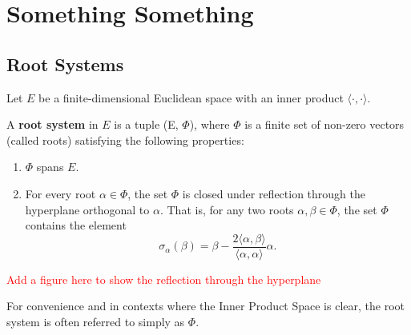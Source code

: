 %


\chapter{Something Something}
\section{Root Systems}

\begin{definition}
    Let $E$ be a finite-dimensional Euclidean space with an inner product $\langle \cdot, \cdot \rangle$.
    
    A \textbf{root system} in $E$ is a tuple (E, $\Phi$), where $\Phi$ is a finite set of non-zero vectors (called roots) satisfying the following properties:
    \begin{enumerate}
        \item $\Phi$ spans $E$.
        \item For every root $\alpha \in \Phi$, the set $\Phi$ is closed under reflection through the hyperplane orthogonal to $\alpha$.
        That is, for any two roots $\alpha, \beta \in \Phi$, the set $\Phi$ contains the element
        \begin{equation*}
            \sigma_\alpha(\beta) = \beta - \frac{2 \langle \alpha, \beta \rangle}{\langle \alpha, \alpha \rangle} \alpha.
        \end{equation*}
    \end{enumerate}
\end{definition}

\textcolor{red}{Add a figure here to show the reflection through the hyperplane}

For convenience and in contexts where the Inner Product Space is clear, the root system is often referred to simply as $\Phi$.

